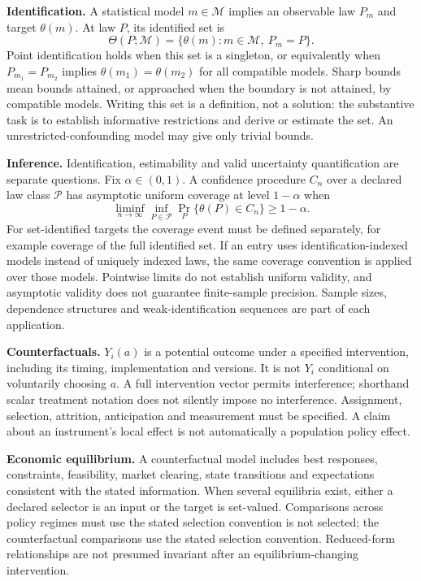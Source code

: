 \documentclass[11pt,a4paper]{article}
\begin{document}
\textbf{Identification.} A statistical model $m\in\mathcal M$ implies an observable law $P_m$ and target $\theta(m)$. At law $P$, its identified set is
\[
\Theta(P;\mathcal M)=\{\theta(m):m\in\mathcal M,\ P_m=P\}.
\]
Point identification holds when this set is a singleton, or equivalently when $P_{m_1}=P_{m_2}$ implies $\theta(m_1)=\theta(m_2)$ for all compatible models. Sharp bounds mean bounds attained, or approached when the boundary is not attained, by compatible models. Writing this set is a definition, not a solution: the substantive task is to establish informative restrictions and derive or estimate the set. An unrestricted-confounding model may give only trivial bounds.

\textbf{Inference.} Identification, estimability and valid uncertainty quantification are separate questions. Fix $\alpha\in(0,1)$. A confidence procedure $C_n$ over a declared law class $\mathcal P$ has asymptotic uniform coverage at level $1-\alpha$ when
\[
\liminf_{n\to\infty}\inf_{P\in\mathcal P}\Pr_P\{\theta(P)\in C_n\}\geq1-\alpha.
\]
For set-identified targets the coverage event must be defined separately, for example coverage of the full identified set. If an entry uses identification-indexed models instead of uniquely indexed laws, the same coverage convention is applied over those models. Pointwise limits do not establish uniform validity, and asymptotic validity does not guarantee finite-sample precision. Sample sizes, dependence structures and weak-identification sequences are part of each application.

\textbf{Counterfactuals.} $Y_i(a)$ is a potential outcome under a specified intervention, including its timing, implementation and versions. It is not $Y_i$ conditional on voluntarily choosing $a$. A full intervention vector permits interference; shorthand scalar treatment notation does not silently impose no interference. Assignment, selection, attrition, anticipation and measurement must be specified. A claim about an instrument's local effect is not automatically a population policy effect.

\textbf{Economic equilibrium.} A counterfactual model includes best responses, constraints, feasibility, market clearing, state transitions and expectations consistent with the stated information. When several equilibria exist, either a declared selector is an input or the target is set-valued. Comparisons across policy regimes must use the stated selection convention is not selected; the counterfactual comparisons use the stated selection convention. Reduced-form relationships are not presumed invariant after an equilibrium-changing intervention.
\end{document}
